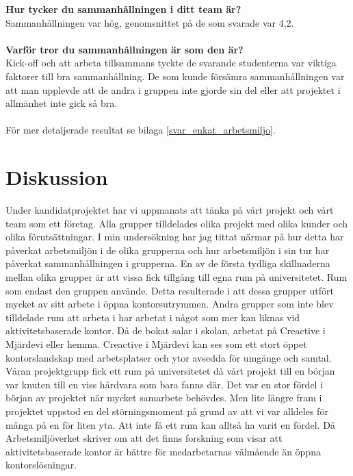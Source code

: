 \textbf{Hur tycker du sammanhållningen i ditt team är?}\\
Sammanhållningen var hög, genomsnittet på de som svarade var 4,2.\\\\
\textbf{Varför tror du sammanhållningen är som den är?}\\
Kick-off och att arbeta tillsammans tyckte de svarande studenterna var viktiga faktorer till bra sammanhållning. De som kunde försämra sammanhållningen var att man upplevde att de andra i gruppen inte gjorde sin del eller att projektet i allmänhet inte gick så bra.\\\\
För mer detaljerade resultat se bilaga \ref{svar_enkat_arbetsmiljo}.

\section{Diskussion}
\label{sec:discussion-hampus}
Under kandidatprojektet har vi uppmanats att tänka på vårt projekt och vårt team som ett företag. Alla grupper tilldelades olika projekt med olika kunder och olika förutsättningar. I min undersökning har jag tittat närmar på hur detta har påverkat arbetsmiljön i de olika grupperna och hur arbetsmiljön i sin tur har påverkat sammanhållningen i grupperna. En av de första tydliga skillnaderna mellan olika grupper är att vissa fick tillgång till egna rum på universitetet. Rum som endast den gruppen använde. Detta resulterade i att dessa grupper utfört mycket av sitt arbete i öppna kontorsutrymmen. Andra grupper som inte blev tilldelade rum att arbeta i har arbetat i något som mer kan liknas vid aktivitetsbaserade kontor. Då de bokat salar i skolan, arbetat på Creactive i Mjärdevi eller hemma. Creactive i Mjärdevi kan ses som ett stort öppet kontorslandskap med arbetsplatser och ytor avsedda för umgänge och samtal. Våran projektgrupp fick ett rum på universitetet då vårt projekt till en början var knuten till en viss hårdvara som bara fanns där. Det var en stor fördel i början av projektet när mycket samarbete behövdes. Men lite längre fram i projektet uppstod en del störningsmoment på grund av att vi var alldeles för många på en för liten yta. Att inte få ett rum kan alltså ha varit en fördel. Då Arbetsmiljöverket skriver om att det finns forskning som visar att aktivitetsbaserade kontor är bättre för medarbetarnas välmående än öppna kontorslösningar. 

